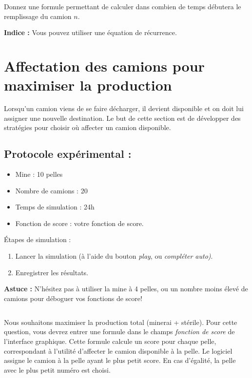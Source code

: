 \documentclass[letterpaper,12pt]{article}
\begin{document}
	Donnez une formule permettant de calculer dans combien de temps débutera le remplissage du camion $n$.
	
	\textbf{Indice :} Vous pouvez utiliser une équation de récurrence.
	
	

	\section{Affectation des camions pour maximiser la production}
	\label{sec:score}
	
	Lorsqu'un camion viens de se faire décharger, il devient disponible et on doit lui assigner une nouvelle destination. Le but de cette section est de développer des stratégies pour choisir où affecter un camion disponible. 
	
	
	\subsection*{Protocole expérimental : }
	
	\begin{itemize}
		\item Mine : 10 pelles
		\item Nombre de camions : 20
		\item Temps de simulation : 24h
		\item Fonction de score : votre fonction de score.
	\end{itemize}
	
	Étapes de simulation : 
	\begin{enumerate}
		\item Lancer la simulation (à l'aide du bouton \textit{play}, ou \textit{compléter auto)}.
		\item   Enregistrer les résultats.
	\end{enumerate}
	
	\textbf{Astuce : }N'hésitez pas à utiliser la mine à 4 pelles, ou un nombre moins élevé de camions pour déboguer vos fonctions de score!
	
	\subsection{} 
	
	Nous souhaitons maximiser la production total (minerai + stérile). Pour cette question, vous devrez entrer une formule dans le champs \textit{fonction de score} de l'interface graphique. Cette formule calcule un score pour chaque pelle, correspondant à l'utilité d'affecter le camion disponible à la pelle. Le logiciel assigne le camion à la pelle ayant le plus petit score. En cas d'égalité, la pelle avec le plus petit numéro est choisi.
	
\end{document}
